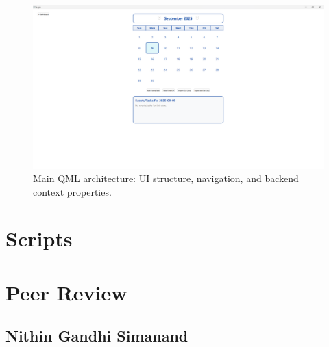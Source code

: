 \documentclass{report}
\begin{document}
\begin{figure}
\centering
\includegraphics[width=\linewidth,height=\textheight,keepaspectratio]{png_files/Calendar.png}
\caption{Main QML architecture: UI structure, navigation, and backend context properties.}
\end{figure}

\chapter{Scripts}\label{Scripts}

\chapter{Peer Review}
\section{Nithin Gandhi Simanand}
\end{document}
